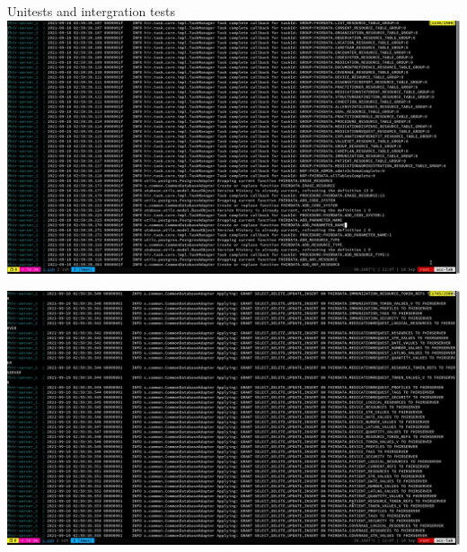 \documentclass{beamer}
\begin{document}
\begin{CJK*}{UTF8}{bsmi}
  \begin{frame}{Unitests and intergration tests}
    \includegraphics[width=\textwidth]{photo_2021-09-10_14-04-02.jpg}
  \end{frame}

  \begin{frame}
    \includegraphics[width=\textwidth]{photo_2021-09-10_14-03-57.jpg}
  \end{frame}


\end{CJK*}
\end{document}
